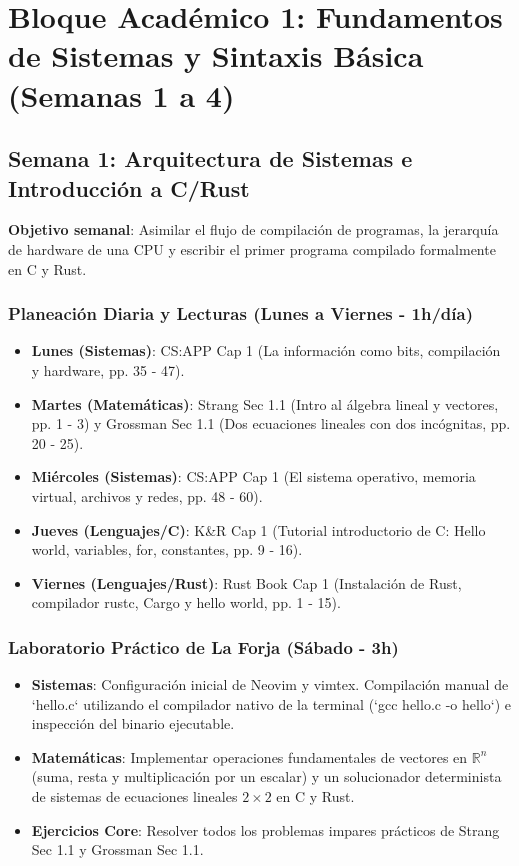 \documentclass[11pt, a4paper]{article}
\begin{document}

\section{Bloque Académico 1: Fundamentos de Sistemas y Sintaxis Básica (Semanas 1 a 4)}

\subsection{Semana 1: Arquitectura de Sistemas e Introducción a C/Rust}
\textbf{Objetivo semanal}: Asimilar el flujo de compilación de programas, la jerarquía de hardware de una CPU y escribir el primer programa compilado formalmente en C y Rust.

\subsubsection{Planeación Diaria y Lecturas (Lunes a Viernes - 1h/día)}
\begin{itemize}
    \item \textbf{Lunes (Sistemas)}: CS:APP Cap 1 (La información como bits, compilación y hardware, pp. 35 - 47).
    \item \textbf{Martes (Matemáticas)}: Strang Sec 1.1 (Intro al álgebra lineal y vectores, pp. 1 - 3) y Grossman Sec 1.1 (Dos ecuaciones lineales con dos incógnitas, pp. 20 - 25).
    \item \textbf{Miércoles (Sistemas)}: CS:APP Cap 1 (El sistema operativo, memoria virtual, archivos y redes, pp. 48 - 60).
    \item \textbf{Jueves (Lenguajes/C)}: K\&R Cap 1 (Tutorial introductorio de C: Hello world, variables, for, constantes, pp. 9 - 16).
    \item \textbf{Viernes (Lenguajes/Rust)}: Rust Book Cap 1 (Instalación de Rust, compilador rustc, Cargo y hello world, pp. 1 - 15).
\end{itemize}

\subsubsection{Laboratorio Práctico de La Forja (Sábado - 3h)}
\begin{itemize}
    \item \textbf{Sistemas}: Configuración inicial de Neovim y vimtex. Compilación manual de `hello.c` utilizando el compilador nativo de la terminal (`gcc hello.c -o hello`) e inspección del binario ejecutable.
    \item \textbf{Matemáticas}: Implementar operaciones fundamentales de vectores en $\mathbb{R}^n$ (suma, resta y multiplicación por un escalar) y un solucionador determinista de sistemas de ecuaciones lineales $2 \times 2$ en C y Rust.
    \item \textbf{Ejercicios Core}: Resolver todos los problemas impares prácticos de Strang Sec 1.1 y Grossman Sec 1.1.
\end{itemize}
\end{document}
